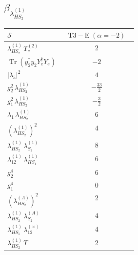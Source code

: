\documentclass[9pt]{article}
\begin{document}
\subsection*{$ \beta_{\lambda_{HS_2}^{(1)}} $}
\begin{longtable}{@{}p{0.31\linewidth}c@{}}
\toprule
$\mathcal{S}$ & $ \mathrm{T3-E}\;(\alpha=-2) $ \\
\midrule
$ \lambda_{HS_2}^{(1)}\,T_{\nu}^{(2)} $ & $ 2 $ \\
$ \operatorname{Tr}(y_2^\dagger y_2Y_e^\dagger Y_e) $ & $ -2 $ \\
$ |\lambda_5|^2 $ & $ 4 $ \\
$ g_2^2\,\lambda_{HS_2}^{(1)} $ & $ - \frac{33}{2} $ \\
$ g_1^2\,\lambda_{HS_2}^{(1)} $ & $ - \frac{3}{2} $ \\
$ \lambda_1\,\lambda_{HS_2}^{(1)} $ & $ 6 $ \\
$ \left(\lambda_{HS_2}^{(1)}\right)^2 $ & $ 4 $ \\
$ \lambda_{HS_2}^{(1)}\,\lambda_{S_2}^{(1)} $ & $ 8 $ \\
$ \lambda_{12}^{(1)}\,\lambda_{HS_1}^{(1)} $ & $ 6 $ \\
$ g_2^4 $ & $ 6 $ \\
$ g_1^4 $ & $ 0 $ \\
$ \left(\lambda_{HS_2}^{(A)}\right)^2 $ & $ 2 $ \\
$ \lambda_{HS_2}^{(1)}\,\lambda_{S_2}^{(A)} $ & $ 4 $ \\
$ \lambda_{HS_1}^{(1)}\,\lambda_{12}^{(\times)} $ & $ 4 $ \\
$ \lambda_{HS_2}^{(1)}\,T $ & $ 2 $ \\
\bottomrule
\end{longtable}
\end{document}
